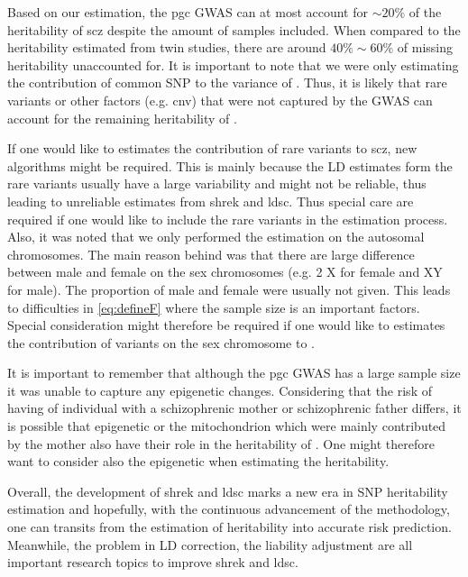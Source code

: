 	Based on our estimation, the \gls{pgc}  \gls{GWAS} can at most account for $\sim20\%$ of the heritability of \gls{scz} despite the amount of samples included.
	When compared to the heritability estimated from twin studies, there are around $40\%\sim60\%$ of missing heritability unaccounted for. 
	It is important to note that we were only estimating the contribution of common \gls{SNP} to the variance of .
	Thus, it is likely that rare variants or other factors (e.g. \gls{cnv}) that were not captured by the \gls{GWAS} can account for the remaining heritability of .
	
	If one would like to estimates the contribution of rare variants to \gls{scz}, new algorithms might be required. 
	This is mainly because the \gls{LD} estimates form the rare variants usually have a large variability and might not be reliable, thus leading to unreliable estimates from \gls{shrek} and \gls{ldsc}.
	Thus special care are required if one would like to include the rare variants in the estimation process.
	Also, it was noted that we only performed the estimation on the autosomal chromosomes.
	The main reason behind was that there are large difference between male and female on the sex chromosomes (e.g. 2 X for female and XY for male).
	The proportion of male and female were usually not given. 
	This leads to difficulties in \cref{eq:defineF} where the sample size is an important factors.
	Special consideration might therefore be required if one would like to estimates the contribution of variants on the sex chromosome to .
	
	It is important to remember that although the \gls{pgc}  \gls{GWAS} has a large sample size it was unable to capture any epigenetic changes.
	Considering that the risk of having  of individual with a schizophrenic mother or schizophrenic father differs, it is possible that epigenetic or the mitochondrion which were mainly contributed by the mother also have their role in the heritability of . 
	One might therefore want to consider also the epigenetic when estimating the heritability.

	Overall, the development of \gls{shrek} and \gls{ldsc} marks a new era in \gls{SNP} heritability estimation and hopefully, with the continuous advancement of the methodology, one can transits from the estimation of heritability into accurate risk prediction.
	Meanwhile, the problem in \gls{LD} correction, the liability adjustment are all important research topics to improve \gls{shrek} and \gls{ldsc}.
	
